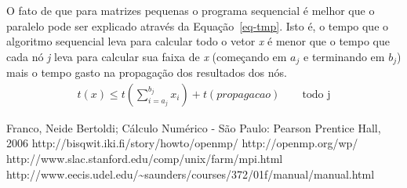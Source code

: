 \documentclass[a4paper]{article}
\begin{document}
\indent O fato de que para matrizes pequenas o programa sequencial é melhor que o paralelo pode ser explicado através da Equação~\ref{eq-tmp}. Isto é, o tempo que o algoritmo sequencial leva para calcular todo o vetor \emph{x} é menor que o tempo que cada nó \emph{j} leva para calcular sua faixa de \emph{x} (começando em \emph{\begin{math}a_j\end{math}} e terminando em \emph{\begin{math}b_j\end{math}}) mais o tempo gasto na propagação dos resultados dos nós.
\begin{eqnarray} \label{eq-tmp}
	t(x) \le t(\sum_{i=a_j}^{b_j}x_i) + t(propagacao) \qquad \textrm{todo j}
\end{eqnarray}

\begin{thebibliography}{99}
	 Franco, Neide Bertoldi; Cálculo Numérico - São Paulo: Pearson Prentice Hall, 2006
	 http://bisqwit.iki.fi/story/howto/openmp/
	 http://openmp.org/wp/
	 http://www.slac.stanford.edu/comp/unix/farm/mpi.html
	 http://www.eecis.udel.edu/\~{}saunders/courses/372/01f/manual/manual.html
\end{thebibliography}
\end{document}

